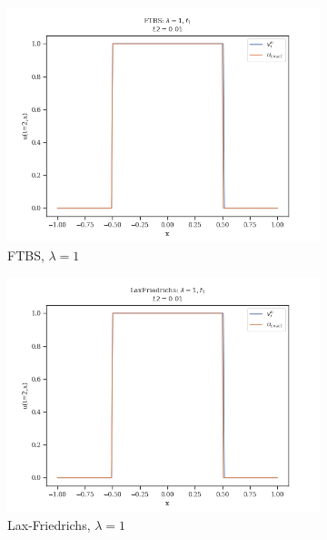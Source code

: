 \begin{figure}
\begin{subfigure}{0.3\linewidth}
        \includegraphics[width=\linewidth]{figures/FTBS/FTBS_lambda=1,f1}
        \caption{FTBS, $\lambda = 1$}
    \end{subfigure}
    \hfill
    \begin{subfigure}{0.3\linewidth}
        \centering
        \includegraphics[width=\linewidth]{figures/LaxFriedrichs/LaxFriedrichs_lambda=1,f1}
        \caption{Lax-Friedrichs, $\lambda =1$}
    \end{subfigure}
    \hfill
    \begin{subfigure}{0.3\linewidth}
        \centering

\end{subfigure}
\end{figure}
